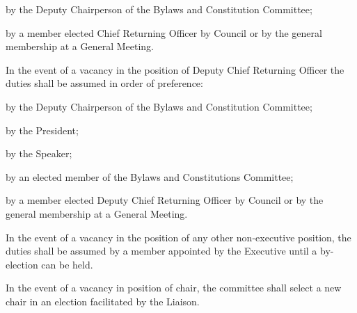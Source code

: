 \begin{longenum}[ label*=\thesubsection.\arabic*., align=left]
\begin{longenum}[ label*=\arabic*., align=left]
\begin{longenum}[ label*=\arabic*., align=left]
				\item by the Deputy Chairperson of the Bylaws and Constitution Committee;
				\item by a member elected Chief Returning Officer by Council or by the general membership at a General Meeting.
			\end{longenum}
			\item In the event of a vacancy in the position of Deputy Chief Returning Officer the duties shall be assumed in order of preference:
			\begin{longenum}[ label*=\arabic*., align=left]
				\item by the Deputy Chairperson of the Bylaws and Constitution Committee;
				\item by the President;
				\item by the Speaker;
                \item by an elected member of the Bylaws and Constitutions Committee;
                \item by a member elected Deputy Chief Returning Officer by Council or by the general membership at a General Meeting.
			\end{longenum}
			\item In the event of a vacancy in the position of any other non-executive position, the duties shall be assumed by a member appointed by the Executive until a by-election can be held.
			\item In the event of a vacancy in position of chair, the committee shall select a new chair in an election facilitated by the Liaison.
		\end{longenum}
	\end{longenum}
